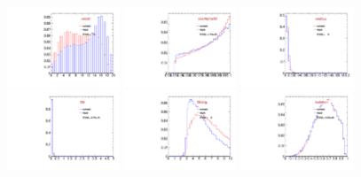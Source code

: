 \begin{figure}
  \centering
  \includegraphics[width=0.3\textwidth]{Figures/VariablesComparison/Data_barrel_figs/closetrk}
  \includegraphics[width=0.3\textwidth]{Figures/VariablesComparison/Data_barrel_figs/cosa}
  \includegraphics[width=0.3\textwidth]{Figures/VariablesComparison/Data_barrel_figs/docatrk}
  \includegraphics[width=0.3\textwidth]{Figures/VariablesComparison/Data_barrel_figs/fl3d}
  \includegraphics[width=0.3\textwidth]{Figures/VariablesComparison/Data_barrel_figs/fls3d}
  \includegraphics[width=0.3\textwidth]{Figures/VariablesComparison/Data_barrel_figs/iso}

\end{figure}
